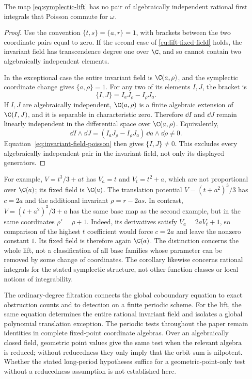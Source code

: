 \begin{corollary}
\label{cor:no-liouville-pair}
The map \eqref{eq:symplectic-lift} has no pair of algebraically independent
rational first integrals that Poisson commute for $\omega$.
\end{corollary}

\begin{proof}
Use the convention $\{t,s\}=\{a,r\}=1$, with brackets between the two
coordinate pairs equal to zero. If the second case of
\eqref{eq:lift-fixed-field} holds, the invariant field has transcendence
degree one over $\C$, and so cannot contain two algebraically independent
elements.

In the exceptional case the entire invariant field is $\C(a,\rho)$, and
the symplectic coordinate change gives $\{a,\rho\}=1$. For any two of its
elements $I,J$, the bracket is
\begin{equation}
 \{I,J\}=I_aJ_\rho-I_\rho J_a.
 \label{eq:invariant-field-poisson}
\end{equation}
If $I,J$ are algebraically independent, $\C(a,\rho)$ is a finite
algebraic extension of $\C(I,J)$, and it is separable in characteristic
zero. Therefore $\dd I$ and $\dd J$ remain linearly independent in the
differential space over $\C(a,\rho)$. Equivalently,
\[
 \dd I\wedge\dd J
 =(I_aJ_\rho-I_\rho J_a)\,\dd a\wedge\dd\rho\ne0.
\]
Equation~\eqref{eq:invariant-field-poisson} then gives $\{I,J\}\ne0$.
This excludes every algebraically independent pair in the invariant
field, not only its displayed generators.
\end{proof}

For example, $V=t^3/3+at$ has $V_a=t$ and $V_t=t^2+a$, which are not
proportional over $\C(a)$; its fixed field is $\C(a)$. The translation
potential $V=(t+a^2)^3/3$ has $c=2a$ and the additional invariant
$\rho=r-2as$. In contrast, $V=(t+a^2)^3/3+a$ has the same base map
as the second example, but in the same coordinates $\rho'=\rho+1$.
Indeed, its derivatives satisfy
$V_a=2aV_t+1$, so comparison of the highest $t$ coefficient would force
$c=2a$ and leave the nonzero constant $1$. Its fixed field is therefore
again $\C(a)$. The distinction concerns the whole lift, not a
classification of all base families whose parameter can be removed by
some change of coordinates. The corollary likewise concerns rational
integrals for the stated symplectic structure, not other function classes
or local notions of integrability.

The ordinary-degree filtration connects the global coboundary equation
to exact obstruction counts and to detection on a finite periodic scheme.
For the lift, the same equation determines the entire rational invariant
field and isolates a global polynomial translation exception. The
periodic tests throughout the paper remain identities in complete
fixed-point coordinate algebras. Over an algebraically closed field,
geometric point values give the same test when the relevant algebra is
reduced; without reducedness they only imply that the orbit sum is
nilpotent. Whether the stated long-period hypotheses suffice for a
geometric-point-only test without a reducedness assumption is not
established here.
